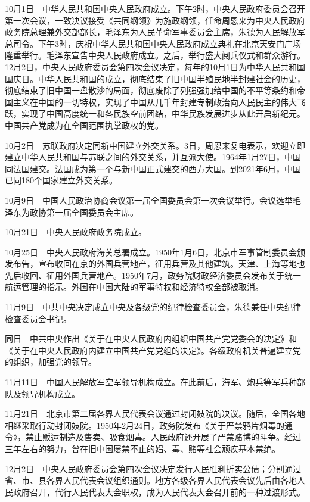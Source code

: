 \documentclass[10pt,a4paper,twocolumn]{book}
\begin{document}
10月1日　中华人民共和国中央人民政府成立。下午2时，中央人民政府委员会召开第一次会议，一致决议接受《共同纲领》为施政纲领，任命周恩来为中央人民政府政务院总理兼外交部部长，毛泽东为人民革命军事委员会主席，朱德为人民解放军总司令。下午3时，庆祝中华人民共和国中央人民政府成立典礼在北京天安门广场隆重举行。毛泽东宣告中央人民政府成立。之后，举行盛大阅兵仪式和群众游行。12月2日，中央人民政府委员会第四次会议决定，每年的10月1日为中华人民共和国国庆日。中华人民共和国的成立，彻底结束了旧中国半殖民地半封建社会的历史，彻底结束了旧中国一盘散沙的局面，彻底废除了列强强加给中国的不平等条约和帝国主义在中国的一切特权，实现了中国从几千年封建专制政治向人民民主的伟大飞跃，实现了中国高度统一和各民族空前团结，中华民族发展进步从此开启新纪元。中国共产党成为在全国范围执掌政权的党。

10月2日　苏联政府决定同新中国建立外交关系。3日，周恩来复电表示，欢迎立即建立中华人民共和国与苏联之间的外交关系，并互派大使。1964年1月27日，中国同法国建交。法国成为第一个与新中国正式建交的西方大国。到2021年6月，中国已同180个国家建立外交关系。

10月9日　中国人民政治协商会议第一届全国委员会第一次会议举行。会议选举毛泽东为政协第一届全国委员会主席。

10月21日　中央人民政府政务院成立。

10月25日　中央人民政府海关总署成立。1950年1月6日，北京市军事管制委员会颁发布告，宣布收回在京的外国兵营地产，征用兵营及其他建筑。天津、上海等地也先后收回、征用外国兵营地产。1950年7月，政务院财政经济委员会发布关于统一航运管理的指示。外国在中国大陆的军事特权和经济特权全部被取消。

11月9日　中共中央决定成立中央及各级党的纪律检查委员会，朱德兼任中央纪律检查委员会书记。

同日　中共中央作出《关于在中央人民政府内组织中国共产党党委会的决定》和《关于在中央人民政府内建立中国共产党党组的决定》。各级政府机关普遍建立党的组织，加强党的领导。

11月11日　中国人民解放军空军领导机构成立。在此前后，海军、炮兵等军兵种部队及领导机构成立。

11月21日　北京市第二届各界人民代表会议通过封闭妓院的决议。随后，全国各地相继采取行动封闭妓院。1950年2月24日，政务院发布《关于严禁鸦片烟毒的通令》，禁止贩运制造及售卖、吸食烟毒。人民政府还开展了严禁赌博的斗争。经过三年左右的努力，曾在旧中国屡禁不止的娼、毒、赌等社会顽疾基本禁绝。

12月2日　中央人民政府委员会第四次会议决定发行人民胜利折实公债；分别通过省、市、县各界人民代表会议组织通则。地方各级各界人民代表会议先后由各地人民政府召开，代行人民代表大会职权，成为人民代表大会召开前的一种过渡形式。
\end{document}
